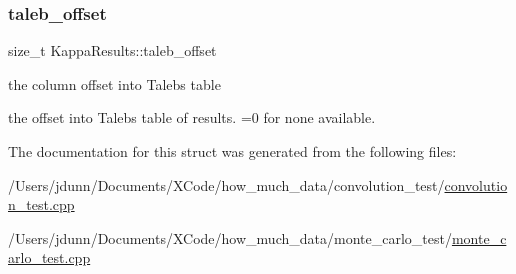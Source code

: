 \subsubsection{\texorpdfstring{taleb\+\_\+offset}{taleb\_offset}}
{\footnotesize\ttfamily size\+\_\+t Kappa\+Results\+::taleb\+\_\+offset}



the column offset into Taleb\textquotesingle{}s table 

the offset into Taleb\textquotesingle{}s table of results. =0 for none available. 

The documentation for this struct was generated from the following files\+:\begin{DoxyCompactItemize}
\item 
/\+Users/jdunn/\+Documents/\+X\+Code/how\+\_\+much\+\_\+data/convolution\+\_\+test/\mbox{\hyperlink{convolution__test_8cpp}{convolution\+\_\+test.\+cpp}}\item 
/\+Users/jdunn/\+Documents/\+X\+Code/how\+\_\+much\+\_\+data/monte\+\_\+carlo\+\_\+test/\mbox{\hyperlink{monte__carlo__test_8cpp}{monte\+\_\+carlo\+\_\+test.\+cpp}}\end{DoxyCompactItemize}
